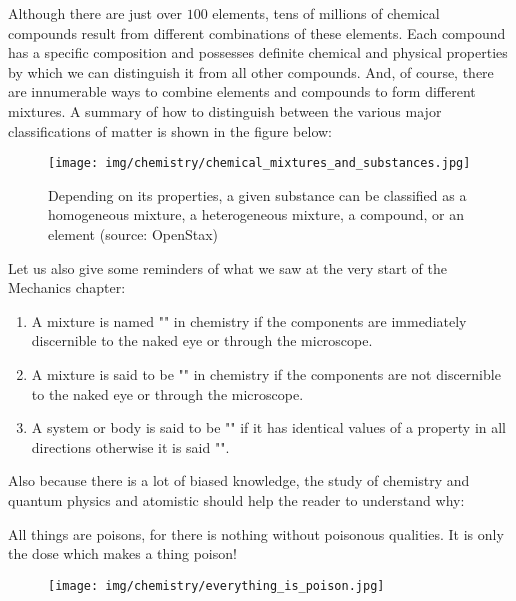 	Although there are just over $100$ elements, tens of millions of chemical compounds result from different combinations of these elements. Each compound has a specific composition and possesses definite chemical and physical properties by which we can distinguish it from all other compounds. And, of course, there are innumerable ways to combine elements and compounds to form different mixtures. A summary of how to distinguish between the various major classifications of matter is shown in the figure below:
	\begin{figure}[H]
		\centering
		\texttt{[image: img/chemistry/chemical\_mixtures\_and\_substances.jpg]}
		\caption[Homogeneous mixture, heterogeneous mixture, compound or element]{Depending on its properties, a given substance can be classified as a homogeneous mixture, a heterogeneous mixture, a compound, or an element (source: OpenStax)}
	\end{figure}

	Let us also give some reminders of what we saw at the very start of the Mechanics chapter:
	\begin{enumerate}
		\item A mixture is named "" in chemistry if the components are immediately discernible to the naked eye or through the microscope.
		
		\item A mixture is said to be "" in chemistry if the components are not discernible to the naked eye or through the microscope.
		
		\item A system or body is said to be "" if it has identical values of a property in all directions otherwise it is said "".
	\end{enumerate}
	
	Also because there is a lot of biased knowledge, the study of chemistry and quantum physics and atomistic should help the reader to understand why:	
	\begin{fquote}[Paracelsus]All things are poisons, for there is nothing without poisonous qualities. It is only the dose which makes a thing poison!
 	\end{fquote}
 	\begin{figure}[H]
		\centering
		\texttt{[image: img/chemistry/everything\_is\_poison.jpg]}
	\end{figure}
	
